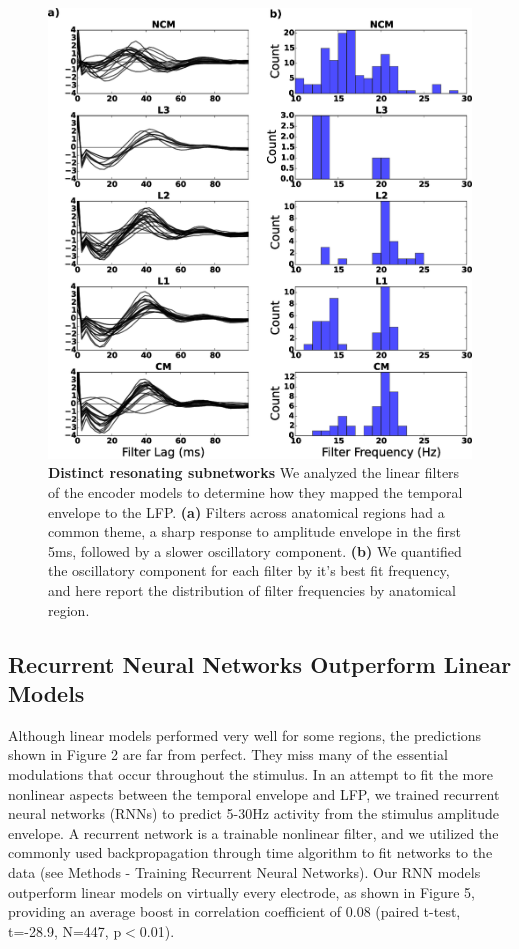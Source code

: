 \begin{figure}
    \caption{\textbf{Distinct resonating subnetworks} We analyzed the linear filters of the encoder models to determine how they mapped the temporal envelope to the LFP. \textbf{(a)} Filters across anatomical regions had a common theme, a sharp response to amplitude envelope in the first 5ms, followed by a slower oscillatory component. \textbf{(b)} We quantified the oscillatory component for each filter by it’s best fit frequency, and here report the distribution of filter frequencies by anatomical region.
}
    \centering
    \includegraphics[scale=0.25]{figure_2_4.eps}
\end{figure}

\subsection{Recurrent Neural Networks Outperform Linear Models}

Although linear models performed very well for some regions, the predictions shown in Figure 2 are far from perfect. They miss many of the essential modulations that occur throughout the stimulus. In an attempt to fit the more nonlinear aspects between the temporal envelope and LFP, we trained recurrent neural networks (RNNs) to predict 5-30Hz activity from the stimulus amplitude envelope. A recurrent network is a trainable nonlinear filter, and we utilized the commonly used backpropagation through time algorithm to fit networks to the data (see Methods - Training Recurrent Neural Networks). Our RNN models outperform linear models on virtually every electrode, as shown in Figure 5, providing an average boost in correlation coefficient of 0.08 (paired t-test, t=-28.9, N=447, p$<$0.01).

